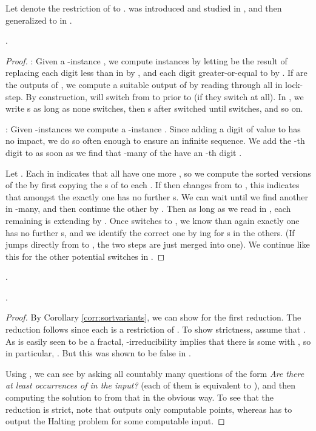 \documentclass{eptcs-modified}
\begin{document}
Let  denote the restriction of  to .  was introduced and studied in \cite{paulyneumann}, and then generalized to  in \cite{hoelzl2}.

\begin{proposition}
.
\begin{proof}
: \quad Given a -instance , we compute   instances  by letting  be the result of replacing each digit less than  in  by , and each digit greater-or-equal to  by . If  are the outputs of , we compute a suitable output  of  by reading through all  in lock-step. By construction,  will switch from  to  prior to  (if they switch at all). In , we write s as long as none switches, then s after  switched until  switches, and so on.

: \quad Given  -instances  we compute a -instance . Since adding a digit of value  to  has no impact, we do so often enough to ensure an infinite sequence. We add the -th digit  to  as soon as we find that -many of the  have an -th digit .

Let . Each  in  indicates that all  have one more , so we compute the sorted versions of the  by first copying the s of  to each . If  then changes from  to , this indicates that amongst the  exactly one has no further s. We can wait until we find another  in -many, and then continue the other  by . Then as long as we read  in , each remaining  is extending by . Once  switches to , we know than again exactly one  has no further s, and we identify the correct one by ing for s in the others. (If  jumps directly from  to , the two steps are just merged into one). We continue like this for the other potential switches in .
\end{proof}
\end{proposition}

\begin{corollary}
\label{corr:sortvariants}
.
\end{corollary}

\begin{proposition}
.
\begin{proof}
By Corollary \ref{corr:sortvariants}, we can show  for the first reduction. The reduction follows since each  is a restriction of . To show strictness, assume that . As  is easily seen to be a fractal, -irreducibility implies that there is some  with , so in particular, . But this was shown to be false in \cite{paulyneumann}.

Using , we can see  by asking all countably many questions of the form \emph{Are there at least  occurrences of  in the input?} (each of them is equivalent to ), and then computing the solution to  from that in the obvious way. To see that the reduction is strict, note that  outputs only computable points, whereas  has to output the Halting problem for some computable input.
\end{proof}
\end{proposition}
\end{document}
